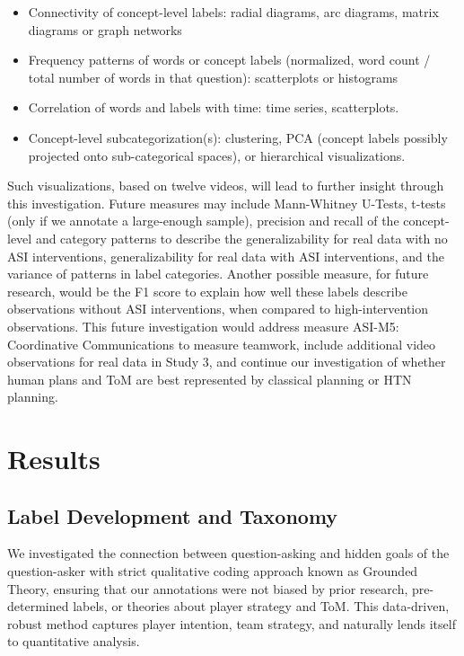 \begin{itemize}

    \item Connectivity of concept-level labels: radial diagrams, arc diagrams,
        matrix diagrams or graph networks

    \item Frequency patterns of words or concept labels (normalized, word count
        / total number of words in that question): scatterplots or histograms

    \item Correlation of words and labels with time: time series, scatterplots. 

    \item Concept-level subcategorization(s): clustering, PCA (concept labels
        possibly projected onto sub-categorical spaces), or hierarchical
        visualizations.

\end{itemize}


Such visualizations, based on twelve videos, will lead to further insight
through this investigation. Future measures may include Mann-Whitney U-Tests,
t-tests (only if we annotate a large-enough sample), precision and recall of
the concept-level and category patterns to describe the generalizability for
real data with no ASI interventions, generalizability for real data with ASI
interventions, and the variance of patterns in label categories. Another
possible measure, for future research, would be the F1 score to explain how
well these labels describe observations without ASI interventions, when
compared to high-intervention observations. This future investigation would
address measure ASI-M5: Coordinative Communications to
measure teamwork, include additional video observations for real data in Study
3, and continue our investigation of whether human plans and ToM are best
represented by classical planning or HTN planning.



\section{Results}

\subsection{Label Development and Taxonomy}
We investigated the connection between question-asking and hidden goals of the question-asker with strict qualitative coding approach known as Grounded Theory, ensuring that our annotations were not biased by prior research, pre-determined labels, or theories about player strategy and ToM. This data-driven, robust method captures player intention, team strategy, and naturally lends itself to quantitative analysis. 


